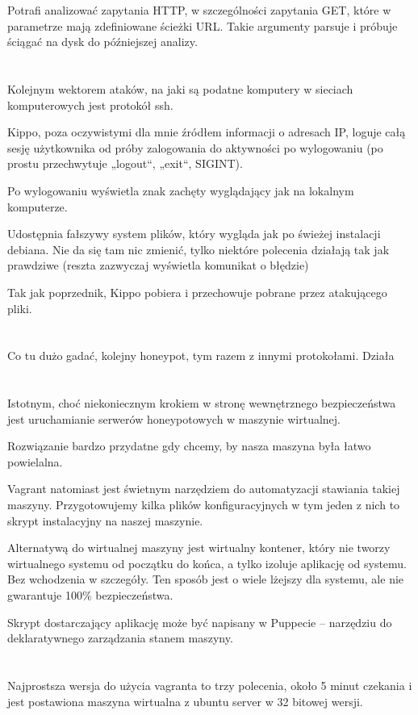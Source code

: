 \documentclass[runningheads,a4paper]{llncs}
\begin{document}
Potrafi analizować zapytania HTTP, w szczególności zapytania GET, które w parametrze mają zdefiniowane ścieżki URL. Takie argumenty parsuje i próbuje ściągać na dysk do późniejszej analizy.
\section{}
Kolejnym wektorem ataków, na jaki są podatne komputery w sieciach komputerowych jest protokół ssh.

Kippo, poza oczywistymi dla mnie źródłem informacji o adresach IP, loguje całą sesję użytkownika od próby zalogowania do aktywności po wylogowaniu (po prostu przechwytuje „logout“, „exit“, SIGINT).

Po wylogowaniu wyświetla znak zachęty wyglądający jak na lokalnym komputerze.

Udostępnia fałszywy system plików, który wygląda jak po świeżej instalacji debiana. Nie da się tam nic zmienić, tylko niektóre polecenia działają tak jak prawdziwe (reszta zazwyczaj wyświetla komunikat o błędzie)

Tak jak poprzednik, Kippo pobiera i przechowuje pobrane przez atakującego pliki.
\section{}
Co tu dużo gadać, kolejny honeypot, tym razem z innymi protokołami. Działa
\section{}
Istotnym, choć niekoniecznym krokiem w stronę wewnętrznego bezpieczeństwa jest uruchamianie serwerów honeypotowych w maszynie wirtualnej.

Rozwiązanie bardzo przydatne gdy chcemy, by nasza maszyna była łatwo powielalna.

Vagrant natomiast jest świetnym narzędziem do automatyzacji stawiania takiej maszyny. Przygotowujemy kilka plików konfiguracyjnych w tym jeden z nich to skrypt instalacyjny na naszej maszynie.

Alternatywą do wirtualnej maszyny jest wirtualny kontener, który nie tworzy wirtualnego systemu od początku do końca, a tylko izoluje aplikację od systemu. Bez wchodzenia w szczegóły. Ten sposób jest o wiele lżejszy dla systemu, ale nie gwarantuje 100\% bezpieczeństwa.

Skrypt dostarczający aplikację może być napisany w Puppecie – narzędziu do deklaratywnego zarządzania stanem maszyny.
\section{}
Najprostsza wersja do użycia vagranta to trzy polecenia, około 5 minut czekania i jest postawiona maszyna wirtualna z ubuntu server w 32 bitowej wersji.
\end{document}
